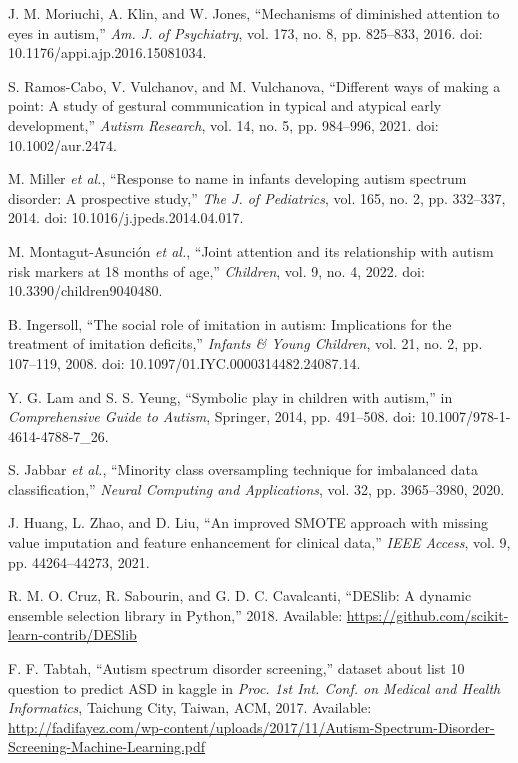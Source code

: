 \documentclass[conference]{IEEEtran}
\begin{document}
\begin{thebibliography}{99}
 J. M. Moriuchi, A. Klin, and W. Jones, ``Mechanisms of diminished attention to eyes in autism,'' \textit{Am. J. of Psychiatry}, vol. 173, no. 8, pp. 825--833, 2016. doi: 10.1176/appi.ajp.2016.15081034.

 S. Ramos-Cabo, V. Vulchanov, and M. Vulchanova, ``Different ways of making a point: A study of gestural communication in typical and atypical early development,'' \textit{Autism Research}, vol. 14, no. 5, pp. 984--996, 2021. doi: 10.1002/aur.2474.

 M. Miller \textit{et al.}, ``Response to name in infants developing autism spectrum disorder: A prospective study,'' \textit{The J. of Pediatrics}, vol. 165, no. 2, pp. 332--337, 2014. doi: 10.1016/j.jpeds.2014.04.017.

 M. Montagut-Asunción \textit{et al.}, ``Joint attention and its relationship with autism risk markers at 18 months of age,'' \textit{Children}, vol. 9, no. 4, 2022. doi: 10.3390/children9040480.

 B. Ingersoll, ``The social role of imitation in autism: Implications for the treatment of imitation deficits,'' \textit{Infants \& Young Children}, vol. 21, no. 2, pp. 107--119, 2008. doi: 10.1097/01.IYC.0000314482.24087.14.

 Y. G. Lam and S. S. Yeung, ``Symbolic play in children with autism,'' in \textit{Comprehensive Guide to Autism}, Springer, 2014, pp. 491--508. doi: 10.1007/978-1-4614-4788-7\_26.

 S. Jabbar \textit{et al.}, ``Minority class oversampling technique for imbalanced data classification,'' \textit{Neural Computing and Applications}, vol. 32, pp. 3965--3980, 2020.

 J. Huang, L. Zhao, and D. Liu, ``An improved SMOTE approach with missing value imputation and feature enhancement for clinical data,'' \textit{IEEE Access}, vol. 9, pp. 44264--44273, 2021.


 R. M. O. Cruz, R. Sabourin, and G. D. C. Cavalcanti, ``DESlib: A dynamic ensemble selection library in Python,'' 2018. Available: \url{https://github.com/scikit-learn-contrib/DESlib}

 F. F. Tabtah, ``Autism spectrum disorder screening,'' dataset about list 10 question to predict ASD in kaggle in \textit{Proc. 1st Int. Conf. on Medical and Health Informatics}, Taichung City, Taiwan, ACM, 2017. Available: \url{http://fadifayez.com/wp-content/uploads/2017/11/Autism-Spectrum-Disorder-Screening-Machine-Learning.pdf}

\end{thebibliography}
\end{document}
